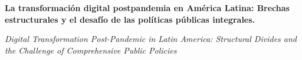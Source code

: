 
\renewcommand{\articuloidiomaxml}{es}
\renewcommand{\articulotitulo}{La transformación digital postpandemia en América Latina: Brechas estructurales y el desafío de las políticas públicas integrales.}
\renewcommand{\articuloautores}{Sol Freitas}
\renewcommand{\articulodoi}{10.5334/dsj-2026-012}
\renewcommand{\articulotipo}{EDITORIAL}
\renewcommand{\articulorevista}{Revista Soma}
\renewcommand{\articuloissne}{2177-1634}
\renewcommand{\articulovolumen}{01}
\renewcommand{\articulonumero}{01}
\renewcommand{\articulofecha}{ 2026}
\renewcommand{\articulopagina}{1}

\setcounter{page}{1}
\thispagestyle{firstpage}

\noindent\begin{minipage}[t]{\dimexpr\textwidth+\marginparsep+\marginparwidth\relax}%
{\sffamily\bfseries\Large\articulotitulo\par}%
\end{minipage}\par
\vspace{3mm}%
\renewcommand{\articulotitulotrans}{Digital Transformation Post-Pandemic in Latin America: Structural Divides and the Challenge of Comprehensive Public Policies}
\noindent\begin{minipage}[t]{\dimexpr\textwidth+\marginparsep+\marginparwidth\relax}%
{\sffamily\itshape\normalsize\articulotitulotrans\par}%
\end{minipage}\par
\vspace{4mm}%

